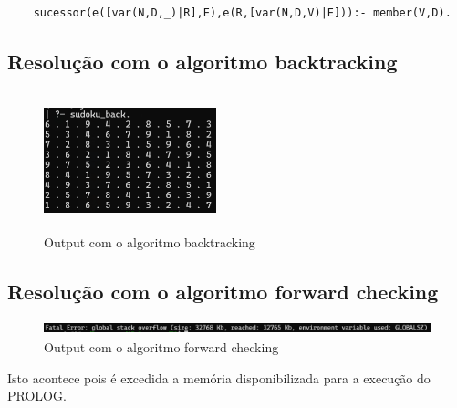 \documentclass{article}
\begin{document}
\begin{verbatim}
    sucessor(e([var(N,D,_)|R],E),e(R,[var(N,D,V)|E])):- member(V,D).
\end{verbatim}

\subsection{Resolução com o algoritmo backtracking}

\begin{figure}[ht]
    \centering
    \includegraphics[width=5cm, height=4cm]{image.png}
    \caption{Output com o algoritmo backtracking}
    \label{fig:Resolução do sudoku com o algoritmo backtracking}
\end{figure}

\subsection{Resolução com o algoritmo forward checking}

\begin{figure}[ht]
    \centering
    \includegraphics[width=15cm, height=0.37cm]{image2.png}
    \caption{Output com o algoritmo forward checking}
    \label{fig:Resolução do sudoku com o algoritmo forwward checking}
\end{figure}

Isto acontece pois é excedida a memória disponibilizada para a execução do PROLOG.
\end{document}
